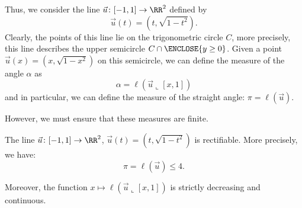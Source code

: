 Thus, we consider the line $\vec u\colon [-1,1]\to \RR^2$ defined by
\[
  \vec u(t) = (t,\sqrt{1-t^2}).
\]
Clearly, the points of this line lie on the trigonometric circle $C$, more
precisely, this line describes the upper semicircle $C\cap\ENCLOSE{y\ge 0}$.
Given a point $\vec u(x) = (x,\sqrt{1-x^2})$ on this semicircle, we can define
the measure of the angle $\alpha$ as
\[
  \alpha = \ell(\vec u\llcorner [x,1])
\]
and in particular, we can define the measure of the straight angle: $\pi =
\ell(\vec u)$.
\mymargin{$\pi$}%
%

However, we must ensure that these measures are finite.

\begin{theorem}
\label{th:ell_u}%
The line $\vec u\colon [-1,1]\to \RR^2$, $\vec u(t) = (t,\sqrt{1-t^2})$ is
rectifiable. More precisely, we have:
\[
  \pi  = \ell(\vec u) \le 4.  
\]

Moreover, the function $x\mapsto \ell(\vec u\llcorner [x,1])$ is strictly
decreasing and continuous.
\end{theorem}

